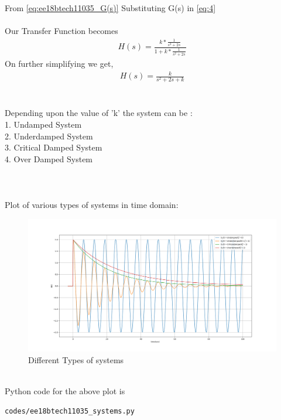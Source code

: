\begin{enumerate}[label=\thesection.\arabic*.,ref=\thesection.\theenumi]
From \eqref{eq:ee18btech11035_G(s)} Substituting G(s) in \eqref{eq:4} \\
\\Our Transfer Function becomes 
\begin{align}
H(s) = \frac{k*\frac{1}{s^2+2s}}{1+k*\frac{1}{s^2+2s}}
\end{align}
On further simplifying we get,\\
\begin{align}
H(s) = \frac{k}{s^2+2s+k}
\label{eq:H(s)}
\end{align}\\
\\
Depending upon the value of 'k' the system can be : \\
1. Undamped System \\
2. Underdamped System \\
3. Critical Damped System \\
4. Over Damped System 
\\
\\
\\
\\Plot of various types of systems in time domain:

\begin{figure}[!h]
  \includegraphics[width=\columnwidth]{./figures/ee18btech11035_different_systems.png}
 \caption{Different Types of systems}
  \label{fig:ee18btech11035_different_systems}
\end{figure}\\
Python code for the above plot is
\begin{lstlisting}
codes/ee18btech11035_systems.py
\end{lstlisting}


\end{enumerate}
